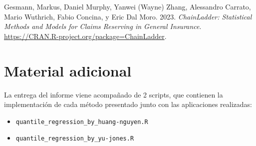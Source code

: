 \documentclass[
  12pt,
]{article}
\newlength{\cslhangindent}
\newlength{\cslentryspacingunit} %
\newenvironment{CSLReferences}[2] %
 {%
  \setlength{\parindent}{0pt}
  \ifodd #1
  \let\oldpar\par
  \def\par{\hangindent=\cslhangindent\oldpar}
  \fi
  \setlength{\parskip}{#2\cslentryspacingunit}
 }%
 {}
\begin{document}
\hypertarget{refs}{}
\begin{CSLReferences}{1}{0}
\leavevmode{}%
Gesmann, Markus, Daniel Murphy, Yanwei (Wayne) Zhang, Alessandro
Carrato, Mario Wuthrich, Fabio Concina, y Eric Dal Moro. 2023.
\emph{ChainLadder: Statistical Methods and Models for Claims Reserving
in General Insurance}.
\url{https://CRAN.R-project.org/package=ChainLadder}.

\end{CSLReferences}

\hypertarget{material-adicional}{%
\section*{Material adicional}\label{material-adicional}}

La entrega del informe viene acompañado de 2 scripts, que contienen la
implementación de cada método presentado junto con las aplicaciones
realizadas:

\begin{itemize}
\item
  \texttt{quantile\_regression\_by\_huang-nguyen.R}
\item
  \texttt{quantile\_regression\_by\_yu-jones.R}
\end{itemize}
\end{document}
